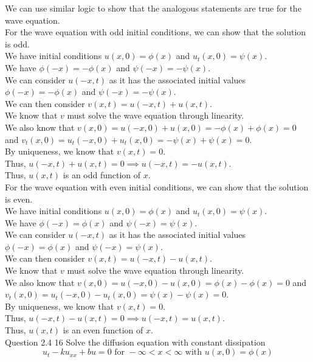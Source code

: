 \documentclass[answers,12pt,addpoints]{exam}
\begin{document}
\begin{questions}
    We can use similar logic to show that the analogous statements are true for the wave equation.\\
    For the wave equation with odd initial conditions, we can show that the solution is odd.\\
    We have initial conditions $u(x,0) = \phi(x)$ and $u_t(x,0) = \psi(x)$.\\
    We have $\phi(-x) = -\phi(x)$ and $\psi(-x) = -\psi(x)$.\\
    We can consider $u(-x,t)$ as it has the associated initial values $\phi(-x) = -\phi(x)$ and $\psi(-x) = -\psi(x)$.\\
    We can then consider $v(x,t) = u(-x,t) + u(x,t)$.\\
    We know that $v$ must solve the wave equation through linearity.\\
    We also know that $v(x,0) = u(-x,0) + u(x,0) = -\phi(x) + \phi(x) = 0$ and $v_t(x,0) = u_t(-x,0) + u_t(x,0) = -\psi(x) + \psi(x) = 0$.\\
    By uniqueness, we know that $v(x,t) = 0$.\\
    Thus, $u(-x,t) + u(x,t) = 0 \implies u(-x,t) = -u(x,t)$.\\
    Thus, $u(x,t)$ is an odd function of $x$.\\
    For the wave equation with even initial conditions, we can show that the solution is even.\\
    We have initial conditions $u(x,0) = \phi(x)$ and $u_t(x,0) = \psi(x)$.\\
    We have $\phi(-x) = \phi(x)$ and $\psi(-x) = \psi(x)$.\\
    We can consider $u(-x,t)$ as it has the associated initial values $\phi(-x) = \phi(x)$ and $\psi(-x) = \psi(x)$.\\
    We can then consider $v(x,t) = u(-x,t) - u(x,t)$.\\
    We know that $v$ must solve the wave equation through linearity.\\
    We also know that $v(x,0) = u(-x,0) - u(x,0) = \phi(x) - \phi(x) = 0$ and $v_t(x,0) = u_t(-x,0) - u_t(x,0) = \psi(x) - \psi(x) = 0$.\\
    By uniqueness, we know that $v(x,t) = 0$.\\
    Thus, $u(-x,t) - u(x,t) = 0 \implies u(-x,t) = u(x,t)$.\\
    Thus, $u(x,t)$ is an even function of $x$.\\
    \question Question 2.4 16
    Solve the diffusion equation with constant dissipation $$u_t - ku_{xx} + bu = 0 \text{ for } -\infty < x< \infty \text{ with } u(x,0) = \phi(x) $$ 

\end{questions}
\end{document}
